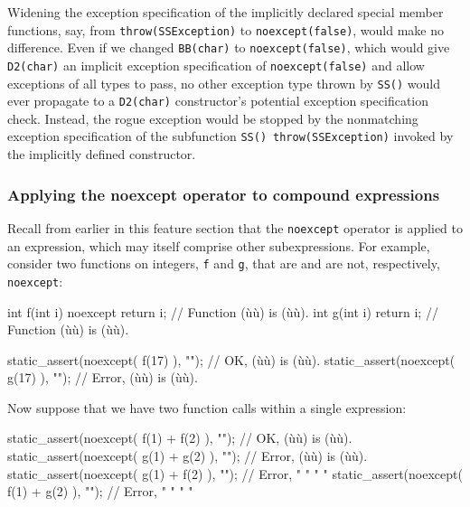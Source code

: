Widening the exception specification of the implicitly declared special
member functions, say, from \lstinline!throw(SSException)! to
\lstinline!noexcept(false)!, would make no difference. Even if we changed
\lstinline!BB(char)! to \lstinline!noexcept(false)!, which would give
\lstinline!D2(char)! an implicit exception specification of
\lstinline!noexcept(false)! and allow exceptions of all types to pass, no
other exception type thrown by \lstinline!SS()! would ever propagate to a
\lstinline!D2(char)! constructor's potential exception specification check.
Instead, the rogue exception would be stopped by the nonmatching
exception specification of the subfunction
\lstinline!SS()!~\lstinline!throw(SSException)! invoked by the implicitly
defined constructor.

\subsubsection[Applying the \lstinline!noexcept! operator to compound expressions]{Applying the {\SubsubsecCode noexcept} operator to compound expressions}\label{applying-the-noexcept-operator-to-compound-expressions}

Recall from earlier in this feature section that the \lstinline!noexcept!
operator is applied to an expression, which may itself comprise other
subexpressions. For example, consider two functions on integers,
\lstinline!f! and \lstinline!g!, that are and are not, respectively,
\lstinline!noexcept!:

\begin{emcppslisting}
int f(int i) noexcept { return i; }  // Function (ù{}ù) is (ù{}ù).
int g(int i)          { return i; }  // Function (ù{}ù) is (ù{}ù).

static_assert(noexcept( f(17) ), "");  // OK,    (ù{}ù) is (ù{}ù).
static_assert(noexcept( g(17) ), "");  // Error, (ù{}ù) is (ù{}ù).
\end{emcppslisting}
    

\noindent Now suppose that we have two function calls within a single expression:

\begin{emcppslisting}
static_assert(noexcept( f(1) + f(2) ), "");  // OK,    (ù{}ù) is (ù{}ù).
static_assert(noexcept( g(1) + g(2) ), "");  // Error, (ù{}ù) is (ù{}ù).
static_assert(noexcept( g(1) + f(2) ), "");  // Error,  "   "      "      "
static_assert(noexcept( f(1) + g(2) ), "");  // Error,  "   "      "      "
\end{emcppslisting}
    

